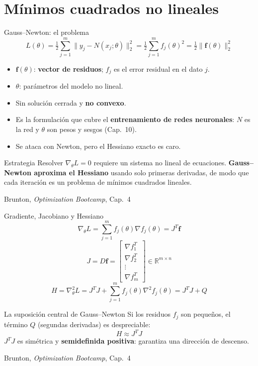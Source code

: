 \documentclass[10pt,aspectratio=169]{beamer}
\newcommand{\fuente}{\vfill{\scriptsize\color{gray}Brunton, \emph{Optimization Bootcamp}, Cap.~4}}
\newcommand{\R}{\mathbb{R}}
\begin{document}
\section{Mínimos cuadrados no lineales}

\begin{frame}{Gauss--Newton: el problema}
  \small
  \[
    L(\theta) = \tfrac12\sum_{j=1}^{m}\|y_j - N(x_j;\theta)\|_2^2
              = \tfrac12\sum_{j=1}^{m} f_j(\theta)^2
              = \tfrac12\|\mathbf{f}(\theta)\|_2^2 \tag{4.54}
  \]
  \begin{itemize}
    \item $\mathbf{f}(\theta)$: \textbf{vector de residuos}; $f_j$ es el error
      residual en el dato $j$.
    \item $\theta$: parámetros del modelo no lineal.
    \item Sin solución cerrada y \textbf{no convexo}.
    \item Es la formulación que cubre el \textbf{entrenamiento de redes
      neuronales}: $N$ es la red y $\theta$ son pesos y sesgos
      (Cap.~10).
    \item Se ataca con Newton, pero el Hessiano exacto es caro.
  \end{itemize}

  \vspace{1mm}
  \begin{block}{Estrategia}
    \scriptsize
    Resolver $\nabla_\theta L = 0$ requiere un sistema no lineal de ecuaciones.
    \textbf{Gauss--Newton aproxima el Hessiano} usando solo primeras derivadas,
    de modo que cada iteración es un problema de mínimos cuadrados
    lineales.
  \end{block}
  \fuente
\end{frame}

\begin{frame}{Gradiente, Jacobiano y Hessiano}
  \small
  \[
    \nabla_\theta L = \sum_{j=1}^{m} f_j(\theta)\nabla f_j(\theta)
                    = J^T\mathbf{f} \tag{4.55}
  \]
  \[
    J = D\mathbf{f} =
    \begin{bmatrix}
      \nabla f_1^T \\ \nabla f_2^T \\ \vdots \\ \nabla f_m^T
    \end{bmatrix}
    \in \R^{m\times n} \tag{4.56}
  \]
  \[
    H = \nabla_\theta^2 L
      = J^TJ + \sum_{j=1}^{m} f_j(\theta)\nabla^2 f_j(\theta)
      = J^TJ + Q \tag{4.58}
  \]

  \begin{block}{La suposición central de Gauss--Newton}
    \small
    Si los residuos $f_j$ son pequeños, el término $Q$ (segundas derivadas) es
    despreciable:
    \[
      H \approx J^TJ \tag{4.59}
    \]
    $J^TJ$ es simétrica y \textbf{semidefinida positiva}: garantiza una
    dirección de descenso.
  \end{block}
  \fuente
\end{frame}
\end{document}
